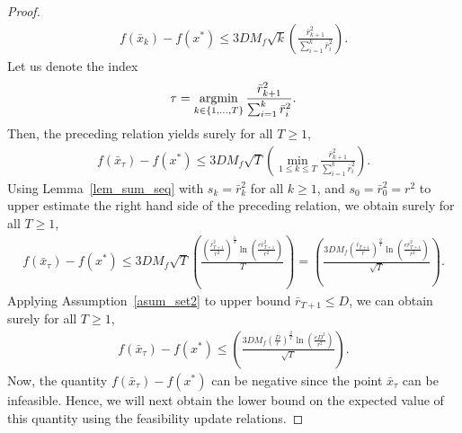 \documentclass{article}
\def\argmin{\mathop{\rm argmin}}
\theoremstyle{plain}
\theoremstyle{definition}
\theoremstyle{remark}
\begin{document}
\begin{proof}
\begin{align*}
    f(\bar{x}_k) - f(x^*) \leq 3 D M_f \sqrt{k} \left( \frac{\bar r_{k+1}^2}{\sum_{i=1}^k \bar r_i^2} \right) .
\end{align*}
Let us denote the index
\begin{align}
    \tau = \argmin_{k \in \{1,\ldots,T\}} \frac{\bar r_{k+1}^2}{\sum_{i=1}^k \bar r_i^2} . \label{indx_tau}
\end{align}
Then, the preceding relation yields surely for all $T \geq 1$,
\begin{align*}
    f(\bar{x}_\tau) - f(x^*) \leq 3 D M_f \sqrt{T} \left( \min_{1 \leq k \leq T} \frac{\bar r_{k+1}^2}{\sum_{i=1}^k \bar r_i^2} \right) .
\end{align*}
Using Lemma~\ref{lem_sum_seq} with $s_k = \bar r_{k}^2$ for all $k \geq 1$, and $s_0 = \bar r_{0}^2 = r^2$ to upper estimate the right hand side of the preceding relation, we obtain surely for all $T \geq 1$,
\begin{align*}
    f(\bar{x}_\tau) - f(x^*) \leq 3 D M_f \sqrt{T} \left(\frac{\left(\frac{\bar r_{T+1}^2}{r^2}\right)^{\frac{1}{T}} \ln \left( \frac{e \bar r_{T+1}^2}{r^2} \right)}{T} \right) =  \left(\frac{ 3 D M_f \left(\frac{\bar r_{T+1}}{r}\right)^{\frac{2}{T}} \ln \left( \frac{e \bar r_{T+1}^2}{r^2} \right)}{\sqrt{T}} \right) .
\end{align*}
Applying Assumption~\ref{asum_set2} to upper bound $\bar r_{T+1} \leq D$, we can obtain surely for all $T \geq 1$,
\begin{align}
    f(\bar{x}_\tau) - f(x^*) \leq \left(\frac{ 3 D M_f \left(\frac{D}{r}\right)^{\frac{2}{T}} \ln \left( \frac{e D^2}{r^2} \right)}{\sqrt{T}} \right) . \label{func_diff_up}
\end{align}
Now, the quantity $f(\bar{x}_\tau) - f(x^*)$ can be negative since the point $\bar{x}_\tau$ can be infeasible. Hence, we will next obtain the lower bound on the expected value of this quantity using the feasibility update relations. 


\end{proof}
\end{document}
